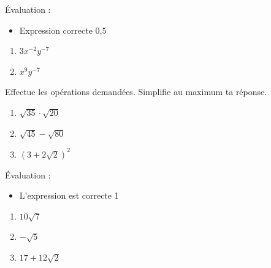 \documentclass[../partie1.tex]{subfiles}
\begin{document}
\begin{solution}
    Évaluation :
    \begin{itemize}
        \item Expression correcte \hfill 0,5
    \end{itemize}
\begin{enumerate}[cols=2]
    \item $3x^{-2}y^{-7}$
    \item $x^9y^{-7}$
\end{enumerate}
\end{solution}
\begin{exercise}[points=3]
    Effectue les opérations demandées. Simplifie au maximum ta réponse.
    \begin{enumerate}[cols=3]
        \item $\sqrt{35}\cdot\sqrt{20}$
        \item $\sqrt{45}-\sqrt{80}$
        \item $\left(3 + 2\sqrt{2}\right)^2$
    \end{enumerate}
\end{exercise}
\begin{solution}
    Évaluation :
    \begin{itemize}
        \item L'expression est correcte \hfill 1
    \end{itemize}
\begin{enumerate}[cols=3]
    \item $10 \sqrt{7}$
    \item $-\sqrt{5}$
    \item $17+12\sqrt{2}$
\end{enumerate}
\end{solution}
\end{document}
